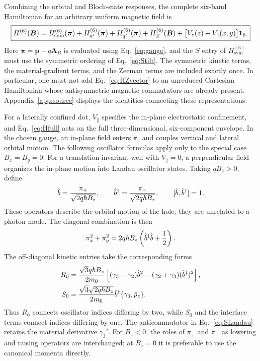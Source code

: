 Combining the orbital and Bloch-state responses, the complete six-band Hamiltonian for an arbitrary uniform magnetic field is
\begin{equation}
\boxed{\displaystyle
H^{(6)}(\bm B)=H_{\mathrm{sym}}^{(6)}(\bm\pi)
+H_{\kappa'}^{(6)}(\bm\pi)+H_{q'}^{(6)}(\bm\pi)
+H_Z^{(6)}(\bm B)
+\bigl[V_z(z)+V_\parallel(x,y)\bigr]\mathbf 1_6.}
\label{eq:Hfull}
\end{equation}
Here $\bm\pi=\bm p-q\bm A_B$ is evaluated using Eq.~\eqref{eq:gauge}, and the $S$ entry of $H_{\mathrm{sym}}^{(6)}$ must use the symmetric ordering of Eq.~\eqref{eq:Stilt}. The symmetric kinetic terms, the material-gradient terms, and the Zeeman terms are included exactly once. In particular, one must not add Eq.~\eqref{eq:HZvector} to an unreduced Cartesian Hamiltonian whose antisymmetric magnetic commutators are already present. Appendix~\ref{app:source} displays the identities connecting these representations.

For a laterally confined dot, $V_\parallel$ specifies the in-plane electrostatic confinement, and Eq.~\eqref{eq:Hfull} acts on the full three-dimensional, six-component envelope. In the chosen gauge, an in-plane field enters $\pi_z$ and couples vertical and lateral orbital motion. The following oscillator formulas apply only to the special case $B_x=B_y=0$. For a translation-invariant well with $V_\parallel=0$, a perpendicular field organizes the in-plane motion into Landau oscillator states. Taking $qB_z>0$, define
\begin{equation}
\hat b=\frac{\pi_+}{\sqrt{2q\hbar B_z}},\qquad
\hat b^\dagger=\frac{\pi_-}{\sqrt{2q\hbar B_z}},\qquad
[\hat b,\hat b^\dagger]=1.
\label{eq:ladder}
\end{equation}
These operators describe the orbital motion of the hole; they are unrelated to a photon mode. The diagonal combination is then
\begin{equation}
\pi_x^2+\pi_y^2=2q\hbar B_z
\left(\hat b^\dagger\hat b+\frac12\right).
\label{eq:Landau}
\end{equation}
The off-diagonal kinetic entries take the corresponding forms
\begin{align}
R_0&=\frac{\sqrt3q\hbar B_z}{2m_0}
\left[(\gamma_3-\gamma_2)\hat b^2
-(\gamma_2+\gamma_3)(\hat b^\dagger)^2\right],\label{eq:RLandau}\\
S_0&=\frac{\sqrt3\sqrt{2q\hbar B_z}}{2m_0}
\hat b^\dagger\{\gamma_3, \hat{p}_ z\}.
\label{eq:SLandau}
\end{align}
Thus $R_0$ connects oscillator indices differing by two, while $S_0$ and the interface terms connect indices differing by one. The anticommutator in Eq.~\eqref{eq:SLandau} retains the material derivative $\gamma_3'$. For $B_z<0$, the roles of $\pi_+$ and $\pi_-$ as lowering and raising operators are interchanged; at $B_z=0$ it is preferable to use the canonical momenta directly.

